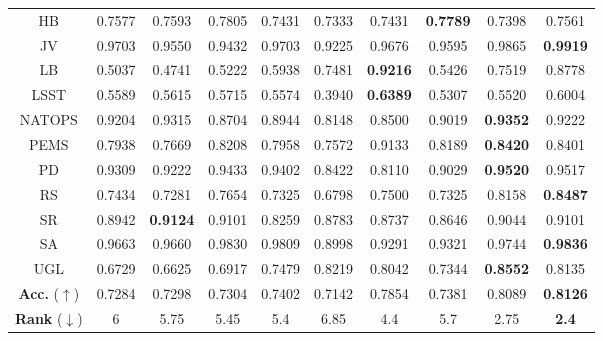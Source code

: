 \begin{table}[htbp]
{\begin{tabular}{cccccccccc}
        HB & 0.7577  & 0.7593  & 0.7805  & 0.7431  & 0.7333  & 0.7431  & \textbf{0.7789}  & 0.7398  & 0.7561  \\ 
        JV & 0.9703  & 0.9550  & 0.9432  & 0.9703  & 0.9225  & 0.9676  & 0.9595  & 0.9865  & \textbf{0.9919}  \\ 
        LB & 0.5037  & 0.4741  & 0.5222  & 0.5938  & 0.7481  & \textbf{0.9216}  & 0.5426  & 0.7519  & 0.8778  \\
        LSST & 0.5589  & 0.5615  & 0.5715  & 0.5574  & 0.3940  & \textbf{0.6389}  & 0.5307  & 0.5520  & 0.6004  \\ 
        NATOPS & 0.9204  & 0.9315  & 0.8704  & 0.8944  & 0.8148  & 0.8500  & 0.9019  & \textbf{0.9352}  & 0.9222  \\ 
        PEMS & 0.7938  & 0.7669  & 0.8208  & 0.7958  & 0.7572  & 0.9133  & 0.8189  & \textbf{0.8420}  & 0.8401  \\ 
        PD & 0.9309  & 0.9222  & 0.9433  & 0.9402  & 0.8422  & 0.8110  & 0.9029  & \textbf{0.9520}  & 0.9517  \\ 
        RS & 0.7434  & 0.7281  & 0.7654  & 0.7325  & 0.6798  & 0.7500  & 0.7325  & 0.8158  & \textbf{0.8487}  \\ 
        SR & 0.8942  & \textbf{0.9124}  & 0.9101  & 0.8259  & 0.8783  & 0.8737  & 0.8646  & 0.9044  & 0.9101  \\ 
        SA & 0.9663  & 0.9660  & 0.9830  & 0.9809  & 0.8998  & 0.9291  & 0.9321  & 0.9744  & \textbf{0.9836}  \\ 
        UGL & 0.6729  & 0.6625  & 0.6917  & 0.7479  & 0.8219  & 0.8042  & 0.7344  & \textbf{0.8552}  & 0.8135  \\ 
    \midrule
        \textbf{Acc.} ($\uparrow$) & 0.7284  & 0.7298  & 0.7304  & 0.7402  & 0.7142  & 0.7854  & 0.7381  & 0.8089  & \textbf{0.8126}  \\
        \textbf{Rank}  ($\downarrow$) & 6 & 5.75 & 5.45 & 5.4 & 6.85 & 4.4 & 5.7 & 2.75 & \textbf{2.4} \\ 
\midrule
\bottomrule
\end{tabular}}
\label{tab:uea30}
\end{table}

